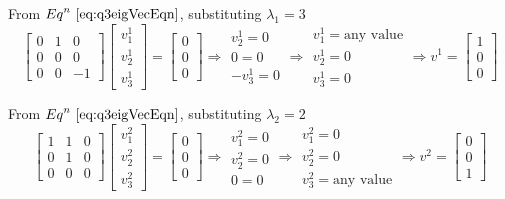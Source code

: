 \documentclass[a4paper]{article}
\begin{document}
\begin{qalist}
			From ${Eq}^{n}~\ref{eq:q3eigVecEqn}$, substituting ${\lambda}_{1} = 3$
			\begin{equation}
				\begin{bmatrix}0 & 1 & 0 \\ 0 & 0 & 0 \\ 0 & 0 & -1\end{bmatrix} 
				\begin{bmatrix}{v}^{1}_{1} \\ {v}^{1}_{2} \\ {v}^{1}_{3}\end{bmatrix} = 
				\begin{bmatrix}0 \\ 0 \\ 0\end{bmatrix}
				\Rightarrow
				\begin{array}{c}
					{v}^{1}_{2} = 0 \\
					0 = 0 \\
					-{v}^{1}_{3} = 0
				\end{array}
				\Rightarrow \begin{array}{c}{v}^{1}_{1} = \text{any value} \\ {v}^{1}_{2} = 0 \\ {v}^{1}_{3} = 0\end{array} \Rightarrow {v}^{1}= \begin{bmatrix}1 \\ 0 \\ 0\end{bmatrix}
			\end{equation}
			
			From ${Eq}^{n}~\ref{eq:q3eigVecEqn}$, substituting ${\lambda}_{2} = 2$
			\begin{equation}
				\begin{bmatrix}1 & 1 & 0 \\ 0 & 1 & 0 \\ 0 & 0 & 0\end{bmatrix} 
				\begin{bmatrix}{v}^{2}_{1} \\ {v}^{2}_{2} \\ {v}^{2}_{3}\end{bmatrix} = 
				\begin{bmatrix}0 \\ 0 \\ 0\end{bmatrix}
				\Rightarrow
				\begin{array}{c}
					{v}^{2}_{1} = 0 \\
					{v}^{2}_{2}= 0 \\
					0 = 0
				\end{array}
				\Rightarrow \begin{array}{c}{v}^{2}_{1} = 0 \\ {v}^{2}_{2} = 0 \\ {v}^{2}_{3} = \text{any value}\end{array} \Rightarrow {v}^{2}= \begin{bmatrix}0 \\ 0 \\ 1\end{bmatrix}
			\end{equation}
			

\end{qalist}
\end{document}
